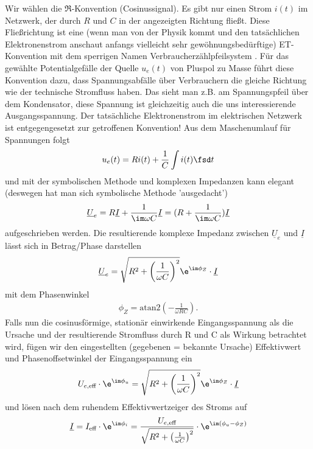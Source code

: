 Wir wählen die $\Re$-Konvention (Cosinussignal).
%
Es gibt nur einen Strom $i(t)$ im Netzwerk, der durch $R$ und $C$ in der angezeigten
Richtung fließt. Diese Fließrichtung ist eine (wenn man von der Physik kommt und den tatsächlichen Elektronenstrom anschaut anfangs vielleicht sehr gewöhnungsbedürftige) ET-Konvention mit dem sperrigen Namen
Verbraucherzählpfeilsystem \cite[S. 7]{Marinescu2020}. Für das gewählte Potentialgefälle
der Quelle $u_e(t)$ von Pluspol zu Masse führt diese Konvention dazu, dass
Spannungsabfälle über Verbrauchern die gleiche Richtung wie der technische
Stromfluss haben. Das sieht man z.B. am Spannungspfeil über dem Kondensator,
diese Spannung ist gleichzeitig auch die uns interessierende Ausgangsspannung.
%
Der tatsächliche Elektronenstrom im elektrischen Netzwerk ist entgegengesetzt
zur getroffenen Konvention!
%
Aus dem Maschenumlauf \cite[Kap. 2.5]{Marinescu2020} für Spannungen folgt
\begin{align}
\label{eq:appb:mascheRC}
u_e(t) = R i(t) +  \frac{1}{C} \int i(t) \fsd t
\end{align}
und mit der symbolischen Methode und komplexen Impedanzen kann elegant (deswegen hat man sich symbolische Methode 'ausgedacht')
\begin{align}
\underline{U}_e = R \underline{I} +  \frac{1}{\im \omega C} \underline{I}
= (R +  \frac{1}{\im \omega C}) \underline{I}
\end{align}
aufgeschrieben werden.
%
Die resultierende komplexe Impedanz zwischen $\underline{U}_e$ und $\underline{I}$
lässt sich in Betrag/Phase darstellen
\begin{align}
\underline{U}_e = \sqrt{R^2 +  \left(\frac{1}{\omega C}\right)^2} \e^{\im \phi_Z} \cdot \underline{I}
\end{align}
mit dem Phasenwinkel
\begin{align}
\phi_Z = \text{atan2}({-\frac{1}{\omega R C}}).
\end{align}
Falls nun die cosinusförmige, stationär einwirkende Eingangsspannung als die
Ursache und der resultierende Stromfluss durch R und C als
Wirkung betrachtet wird, fügen wir den eingestellten (gegebenen = bekannte Ursache)
Effektivwert und Phasenoffsetwinkel der Eingangsspannung ein
\begin{align}
U_{e,\text{eff}} \cdot \e^{\im \phi_u} = \sqrt{R^2 +  \left(\frac{1}{\omega C}\right)^2} \e^{\im \phi_Z} \cdot \underline{I}
\end{align}
und lösen nach dem ruhendem Effektivwertzeiger des Stroms auf
\begin{align}
\underline{I} =
I_\text{eff} \cdot \e^{\im \phi_i} =
\frac{U_{e,\text{eff}}}{\sqrt{R^2 +  \left(\frac{1}{\omega C}\right)^2}}
\cdot \e^{\im (\phi_u-\phi_Z)}
\end{align}
